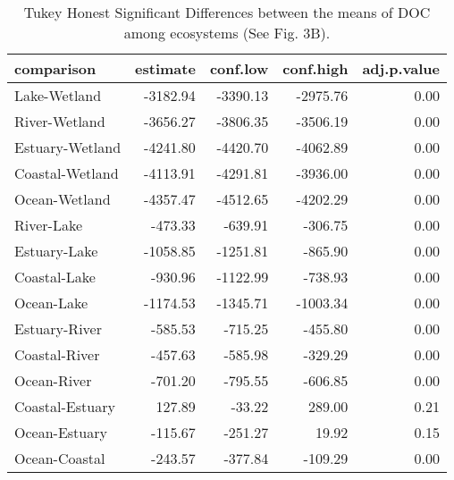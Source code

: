 \begin{table}[ht]
\centering
\begin{tabular}{lrrrr}
  \hline
comparison & estimate & conf.low & conf.high & adj.p.value \\ 
  \hline
Lake-Wetland & -3182.94 & -3390.13 & -2975.76 & 0.00 \\ 
  River-Wetland & -3656.27 & -3806.35 & -3506.19 & 0.00 \\ 
  Estuary-Wetland & -4241.80 & -4420.70 & -4062.89 & 0.00 \\ 
  Coastal-Wetland & -4113.91 & -4291.81 & -3936.00 & 0.00 \\ 
  Ocean-Wetland & -4357.47 & -4512.65 & -4202.29 & 0.00 \\ 
  River-Lake & -473.33 & -639.91 & -306.75 & 0.00 \\ 
  Estuary-Lake & -1058.85 & -1251.81 & -865.90 & 0.00 \\ 
  Coastal-Lake & -930.96 & -1122.99 & -738.93 & 0.00 \\ 
  Ocean-Lake & -1174.53 & -1345.71 & -1003.34 & 0.00 \\ 
  Estuary-River & -585.53 & -715.25 & -455.80 & 0.00 \\ 
  Coastal-River & -457.63 & -585.98 & -329.29 & 0.00 \\ 
  Ocean-River & -701.20 & -795.55 & -606.85 & 0.00 \\ 
  Coastal-Estuary & 127.89 & -33.22 & 289.00 & 0.21 \\ 
  Ocean-Estuary & -115.67 & -251.27 & 19.92 & 0.15 \\ 
  Ocean-Coastal & -243.57 & -377.84 & -109.29 & 0.00 \\ 
   \hline
\end{tabular}
\caption{Tukey Honest Significant Differences between the means of DOC among ecosystems (See Fig. 3B).} 
\end{table}
